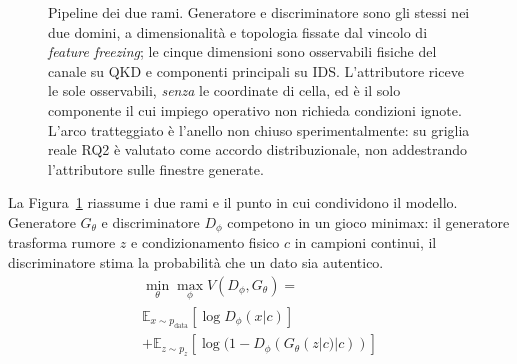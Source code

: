 \documentclass[10pt,conference,a4paper,twocolumn]{IEEEtran}
\begin{document}
\begin{figure}[t]
    \caption{Pipeline dei due rami. Generatore e discriminatore sono gli
        stessi nei due domini, a dimensionalità e topologia fissate dal
        vincolo di \textit{feature freezing}; le cinque dimensioni sono
        osservabili fisiche del canale su QKD e componenti principali su
        IDS. L'attributore riceve le sole osservabili, \emph{senza} le
        coordinate di cella, ed è il solo componente il cui impiego operativo non richieda condizioni ignote. L'arco
        tratteggiato è l'anello non chiuso sperimentalmente: su griglia
        reale RQ2 è valutato come accordo distribuzionale, non addestrando
        l'attributore sulle finestre generate.}
    \label{fig:pipeline}
\end{figure}

La Figura~\ref{fig:pipeline} riassume i due rami e il punto in cui condividono il modello. Generatore $G_\theta$ e discriminatore $D_\phi$ competono in un gioco minimax: il generatore trasforma rumore $z$ e condizionamento fisico $c$ in campioni continui, il discriminatore stima la probabilità che un dato sia autentico.
\begin{equation}
    \begin{split}
        \min_\theta \max_\phi V(D_\phi, G_\theta) = {} \\
        \mathbb{E}_{x \sim p_{\text{data}}}[\log D_\phi(x|c)] \\
        + \mathbb{E}_{z \sim p_z}[\log(1 - D_\phi(G_\theta(z|c)|c))]
    \end{split}
\end{equation}
\end{document}
